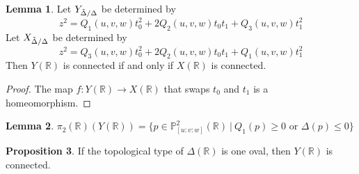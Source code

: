 \documentclass{article}
\newcommand{\Rbb}{\mathbb{R}}
\newcommand{\Pbb}{\mathbb{P}}
\begin{document}
\theoremstyle{definition}
\newtheorem{theorem}{Theorem}[section]
\theoremstyle{definition}
\newtheorem{conjecture}[theorem]{Conjecture}
\theoremstyle{definition}
\newtheorem{definition}[theorem]{Definition}
\theoremstyle{definition}
\newtheorem{goal}[theorem]{Goal}
\theoremstyle{definition}
\newtheorem{corollary}[theorem]{Corollary}
\theoremstyle{definition}
\newtheorem{question}[theorem]{Question}
\theoremstyle{definition}
\newtheorem{lemma}[theorem]{Lemma}
\theoremstyle{definition}
\newtheorem{proposition}[theorem]{Proposition}

\begin{lemma}
Let $Y_{\Tilde{\Delta}/\Delta}$ be determined by
\[z^2 = Q_1(u, v, w)t_0^2 + 2Q_2(u, v, w)t_0 t_1 + Q_3(u, v, w) t_1^2\]
Let $X_{\Tilde{\Delta}/\Delta}$ be determined by
\[z^2 = Q_3(u, v, w)t_0^2 + 2Q_2(u, v, w)t_0 t_1 + Q_1(u, v, w) t_1^2\]
Then $Y(\Rbb)$ is connected if and only if $X(\Rbb)$ is connected.
\end{lemma}

\begin{proof}
The map $f: Y(\Rbb) \to X(\Rbb)$ that swaps $t_0$ and $t_1$ is a homeomorphism.
\end{proof}

\begin{lemma}
$\pi_2(\Rbb)(Y(\Rbb)) = \{p \in \Pbb^2_{[u:v:w]}(\Rbb)\ |\ Q_1(p) \geq 0 \text{ or } \Delta(p) \leq 0\}$
\end{lemma}

\begin{proposition}
If the topological type of $\Delta(\Rbb)$ is one oval, then $Y(\Rbb)$ is connected.
\end{proposition}
\end{document}
